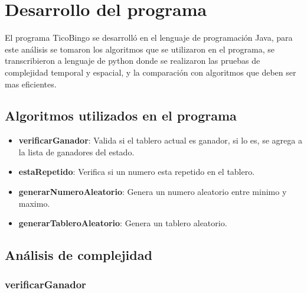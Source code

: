 \documentclass[10pt,twocolumn]{article}
\begin{document}
\section{Desarrollo del programa}

El programa TicoBingo se desarrolló en el lenguaje de programación Java, para este análisis se tomaron los algoritmos que se utilizaron en el programa, se transcribieron a lenguaje de python donde se realizaron las pruebas de complejidad temporal y espacial, y la comparación con algoritmos que deben ser mas eficientes.

\subsection{Algoritmos utilizados en el programa}
\begin{itemize}
\item \textbf{verificarGanador}: Valida si el tablero actual es ganador, si lo es, se agrega a la lista de ganadores del estado.
\item \textbf{estaRepetido}: Verifica si un numero esta repetido en el tablero.
\item \textbf{generarNumeroAleatorio}: Genera un numero aleatorio entre minimo y maximo.
\item \textbf{generarTableroAleatorio}: Genera un tablero aleatorio.

\end{itemize}


\subsection{Análisis de complejidad}

\subsubsection{verificarGanador}
\end{document}
